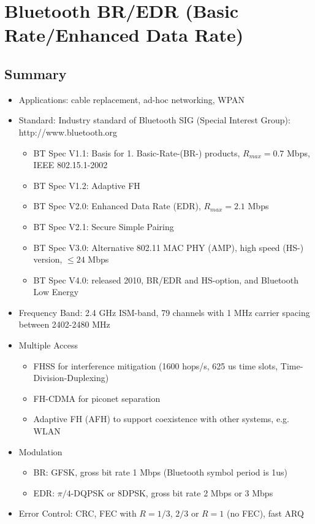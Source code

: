 \section{Bluetooth BR/EDR (Basic Rate/Enhanced Data Rate)}
\subsection{Summary}
\begin{itemize}
	\item Applications: cable replacement, ad-hoc networking, WPAN 
	\item Standard: Industry standard of Bluetooth SIG (Special Interest Group): http://www.bluetooth.org 
	\begin{itemize}
		\item BT Spec V1.1:  Basis for 1. Basic-Rate-(BR-) products, $R_{max} = 0.7$ Mbps, IEEE 802.15.1-2002 
		\item BT Spec V1.2:  Adaptive FH  
		\item BT Spec V2.0:  Enhanced Data Rate (EDR), $R_{max}  = 2.1$ Mbps 
		\item BT Spec V2.1:  Secure Simple Pairing 
		\item BT Spec V3.0:  Alternative 802.11 MAC PHY (AMP), high speed (HS-) version, $\leq 24$ Mbps 
		\item BT Spec V4.0:  released 2010, BR/EDR and HS-option, and Bluetooth Low Energy 
	\end{itemize}
	\item Frequency Band: 2.4 GHz ISM-band, 79 channels with 1 MHz carrier spacing between 2402-2480 MHz
	\item Multiple Access
	\begin{itemize} 
		\item FHSS for interference mitigation (1600 hops/s, 625 us time slots, Time-Division-Duplexing) 
		\item FH-CDMA for piconet separation 
		\item Adaptive FH (AFH) to support coexistence with other systems, e.g. WLAN  
	\end{itemize}
	\item Modulation
	\begin{itemize}
		\item BR: GFSK, gross bit rate 1 Mbps  (Bluetooth symbol period is 1us)
		\item EDR: $\pi/4$-DQPSK or 8DPSK, gross bit rate 2 Mbps or 3 Mbps 
	\end{itemize}
	\item Error Control: CRC, FEC with $R=1/3$, $2/3$ or $R=1$ (no FEC), fast ARQ 

\end{itemize}
